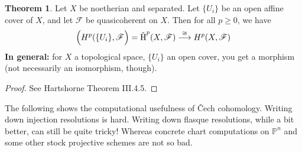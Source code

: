 \documentclass[10pt,reqno]{amsart}
\theoremstyle{definition}
\newtheorem{theorem}{Theorem}
\theoremstyle{remark}
\numberwithin{equation}{section}
\numberwithin{theorem}{section}
\newcommand*{\red}{\textcolor{red}}
\newcommand{\FF}{{\mathscr F}}
\newcommand{\II}{{\mathscr I}}
\newcommand{\PP}{{\mathbb P}}
\begin{document}
\begin{theorem} Let $X$ be noetherian and separated. Let $\{U_i\}$ be an open affine cover of $X$, and let $\FF$ be quasicoherent on $X$. Then for all $p \ge 0$, we have
\[ \Big(H^p(\{U_i\},\FF \Big) = \textup{\v H}^p(X,\FF) \stackrel{\cong}{\longrightarrow} H^p(X,\FF)\]
\textbf{In general:} for $X$ a topological space, $\{U_i\}$ an open cover, you get a morphism (not necessarily an isomorphism, though).
\end{theorem}
\begin{proof}
See Hartshorne Theorem III.4.5.
\begin{comment}
\red{DELAY TILL NEXT TIME: COMPUTATION MORE IMPORTANT: need a few facts}
\\

Define a "sheafified" version of the \v Cech complex, where for any open $V \subseteq X$ you let $i_V: V \to X$ denote the inclusion map, and construct a complex of sheaves on $X$ by setting:
\[\mathscr{C}^p(\{U_i\},\FF) = \prod_{i_0 < \dots<i_p} i_v^*(\FF|_{U_0,\dots,U_p})\]
and define the $d$ maps analogously. By construction, we have $\Gamma(X,\mathscr{C}^{p}(\{U_i\},\FF)) = C^p(\{U_i\},\FF)$.

Look at the two resolutions $0 \to \FF \to \II^{\bullet}$ and $0 \to \FF \to \mathscr{C}^{\bullet}(\{U_i\},\FF)$. A general result on complexes (see Hilton \& Stammbach section IV theorem 4.4) says (since the latter chain has higher cohomology zero-- careful with what that means!) that you get a map of complexes $\mathscr{C}^{\bullet}(\{U_i\},\FF) \to \II^{\bullet}$, inducing the identity map on $\FF$. Then taking global sections and cohomology, we get the desired map.

Why is it an isomorphism? Note that we always have the $U_{i_0 < \dots < i_p}$ are affine because $X$ is separated. Then imbedding into flasque \red{and etc etc etc} we get a chain of isomorphisms and are done.
\end{comment}
\end{proof}

The following shows the computational usefulness of \v Cech cohomology. Writing down injection resolutions is hard. Writing down flasque resolutions, while a bit better, can still be quite tricky! Whereas concrete chart computations on $\PP^n$ and some other stock projective schemes are not so bad.
\end{document}

